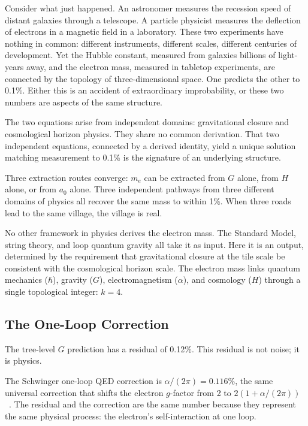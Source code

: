 \documentclass[aps,prd,preprint,superscriptaddress,showpacs,preprintnumbers,amsmath,amssymb,nofootinbib]{revtex4-2}
\begin{document}
Consider what just happened. An astronomer measures the recession speed of distant galaxies through a telescope. A particle physicist measures the deflection of electrons in a magnetic field in a laboratory. These two experiments have nothing in common: different instruments, different scales, different centuries of development. Yet the Hubble constant, measured from galaxies billions of light-years away, and the electron mass, measured in tabletop experiments, are connected by the topology of three-dimensional space. One predicts the other to 0.1\%. Either this is an accident of extraordinary improbability, or these two numbers are aspects of the same structure.

The two equations arise from independent domains: gravitational closure and cosmological horizon physics. They share no common derivation. That two independent equations, connected by a derived identity, yield a unique solution matching measurement to 0.1\% is the signature of an underlying structure.

Three extraction routes converge: $m_e$ can be extracted from $G$ alone, from $H$ alone, or from $a_0$ alone. Three independent pathways from three different domains of physics all recover the same mass to within 1\%. When three roads lead to the same village, the village is real.

No other framework in physics derives the electron mass. The Standard Model, string theory, and loop quantum gravity all take it as input. Here it is an output, determined by the requirement that gravitational closure at the tile scale be consistent with the cosmological horizon scale. The electron mass links quantum mechanics ($\hbar$), gravity ($G$), electromagnetism ($\alpha$), and cosmology ($H$) through a single topological integer: $k = 4$.

\subsection{The One-Loop Correction}
\label{subsec:one-loop}

The tree-level $G$ prediction has a residual of 0.12\%. This residual is not noise; it is physics.

The Schwinger one-loop QED correction is $\alpha/(2\pi) = 0.116\%$, the same universal correction that shifts the electron $g$-factor from 2 to $2(1 + \alpha/(2\pi))$~\cite{schwinger1948}. The residual and the correction are the same number because they represent the same physical process: the electron's self-interaction at one loop.
\end{document}
